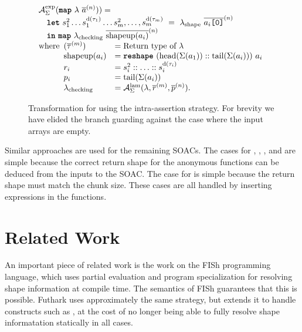 \begin{figure}[t]
  \[
\begin{array}{l}
  \mathcal{A}_{\Sigma}^{\text{exp}}(\mbox{\texttt{\bfseries{map}}}~\lambda~\overline{a}^{(n)})) = \\
  \quad \mbox{\texttt{\bfseries{let}}}~s_{1}^{2} \ldots s_{1}^{\text{d}(\tau_{1})} \ldots s_{m}^{2}, \ldots, s_{m}^{\text{d}(\tau_{m})}~=~\lambda_{\text{\textrm{shape}}}~\overline{a_{i}\texttt{[0]}}^{(n)} \\
  \quad \mbox{\texttt{\bfseries{in}}}~\mbox{\texttt{\bfseries{map}}}~\lambda_{\text{checking}}~\overline{\textrm{shapeup}(a_{i})}^{(n)} \\
  \text{where}
  \begin{array}[t]{ll}
    (\overline{\tau}^{(m)}) & = \mbox{Return type of $\lambda$} \\
    \textrm{shapeup}(a_{i}) & = \mbox{\texttt{\bfseries{reshape}}}~(\textrm{head}(\Sigma(a_{1})) :: \textrm{tail}(\Sigma(a_{i})))~a_{i} \\
    r_{i} & = s_{i}^{2} :: \ldots :: s_{i}^{\text{d}(\tau_{i})} \\
    p_{i} & = \textrm{tail}(\Sigma(a_{i})) \\
    \lambda_{\text{\textrm{checking}}} & = \mathcal{A}_{\Sigma}^{\text{lam}}(\lambda,\overline{r}^{(m)},\overline{p}^{(n)}). \\

  \end{array}
\end{array}
\]

\caption{Transformation for  using the intra-assertion strategy.  For brevity we have elided the branch guarding against the case where the input arrays are empty.}
\label{fig:sizeTransformMap}
\end{figure}

Similar approaches are used for the remaining SOACs.  The cases for
, , , and  are simple
because the correct return shape for the anonymous functions can be
deduced from the inputs to the SOAC.  The case for  is
simple because the return shape must match the chunk size.  These
cases are all handled by inserting  expressions in the
functions.

\section{Related Work}

An important piece of related work is the work on the FISh \cite{fish}
programming language, which uses partial evaluation and program
specialization for resolving shape information at compile time.  The
semantics of FISh guarantees that this is possible.  Futhark uses
approximately the same strategy, but extends it to handle constructs
such as , at the cost of no longer being able to fully
resolve shape informatation statically in all cases.

